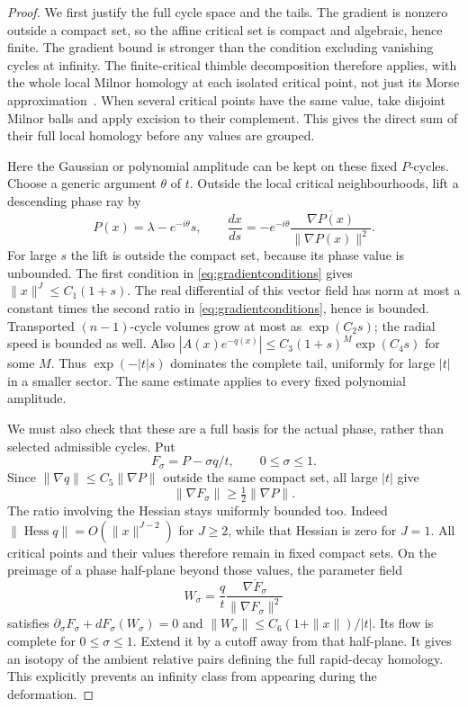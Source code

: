 \begin{proof}
We first justify the full cycle space and the tails. The gradient is
nonzero outside a compact set, so the affine critical set is compact
and algebraic, hence finite. The gradient bound is stronger than the
condition excluding vanishing cycles at infinity. The finite-critical
thimble decomposition therefore applies, with the whole local Milnor
homology at each isolated critical point, not just its Morse
approximation~\cite[Part~I, Sections~1--4]{Pham}.
When several critical points have the same value, take disjoint
Milnor balls and apply excision to their complement. This gives the
direct sum of their full local homology before any values are grouped.

Here the Gaussian or polynomial amplitude can be kept on these fixed
$P$-cycles. Choose a generic argument $\theta$ of $t$. Outside the
local critical neighbourhoods, lift a descending phase ray by
\[
 P(x)=\lambda-e^{-i\theta}s,\qquad
 \frac{dx}{ds}=-e^{-i\theta}
                    \frac{\overline{\nabla P(x)}}{\|\nabla P(x)\|^2}.
\]
For large $s$ the lift is outside the compact set, because its phase
value is unbounded. The first condition in
\eqref{eq:gradientconditions} gives
$\|x\|^J\leq C_1(1+s)$. The real differential of this vector field
has norm at most a constant times the second ratio in
\eqref{eq:gradientconditions}, hence is bounded. Transported
$(n-1)$-cycle volumes grow at most as $\exp(C_2s)$; the radial speed
is bounded as well. Also
$|A(x)e^{-q(x)}|\leq C_3(1+s)^M\exp(C_4s)$ for some $M$.
Thus $\exp(-|t|s)$ dominates the complete tail, uniformly for large
$|t|$ in a smaller sector. The same estimate applies to every fixed
polynomial amplitude.

We must also check that these are a full basis for the actual phase,
rather than selected admissible cycles. Put
\[
 F_\sigma=P-\sigma q/t,\qquad 0\leq\sigma\leq1.
\]
Since $\|\nabla q\|\leq C_5\|\nabla P\|$ outside the same compact
set, all large $|t|$ give
\[
 \|\nabla F_\sigma\|\geq\tfrac12\|\nabla P\|.
\]
The ratio involving the Hessian stays uniformly bounded too. Indeed
$\|\operatorname{Hess}q\|=O(\|x\|^{J-2})$ for $J\geq2$, while
that Hessian is zero for $J=1$.
All critical points and their values therefore remain in fixed compact
sets. On the preimage of a phase half-plane beyond those values, the
parameter field
\[
 W_\sigma=\frac{q}{t}
       \frac{\overline{\nabla F_\sigma}}{\|\nabla F_\sigma\|^2}
\]
satisfies $\partial_\sigma F_\sigma+dF_\sigma(W_\sigma)=0$ and
$\|W_\sigma\|\leq C_6(1+\|x\|)/|t|$. Its flow is complete for
$0\leq\sigma\leq1$. Extend it by a cutoff away from that half-plane.
It gives an isotopy of the ambient relative pairs defining the full
rapid-decay homology. This explicitly prevents an infinity class
from appearing during the deformation.


\end{proof}
